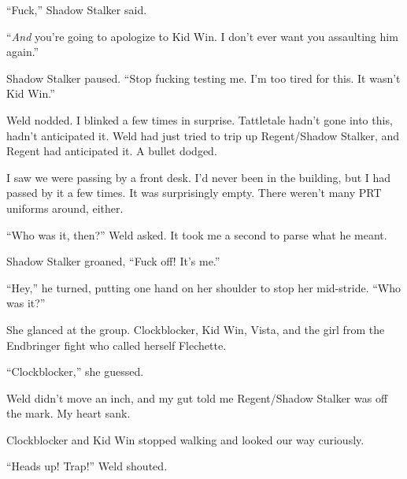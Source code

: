``Fuck,'' Shadow Stalker said.



``\emph{And} you're going to apologize to Kid Win.  I don't ever want you assaulting him again.''



Shadow Stalker paused.  ``Stop fucking testing me.  I'm too tired for this.  It wasn't Kid Win.''



Weld nodded.  I blinked a few times in surprise.  Tattletale hadn't gone into this, hadn't anticipated it. Weld had just tried to trip up Regent/Shadow Stalker, and Regent had anticipated it.  A bullet dodged.



I saw we were passing by a front desk.  I'd never been in the building, but I had passed by it a few times.  It was surprisingly empty.  There weren't many PRT uniforms around, either.



``Who was it, then?'' Weld asked.  It took me a second to parse what he meant.



Shadow Stalker groaned, ``Fuck off!  It's me.''



``Hey,'' he turned, putting one hand on her shoulder to stop her mid-stride.  ``Who was it?''



She glanced at the group.  Clockblocker, Kid Win, Vista, and the girl from the Endbringer fight who called herself Flechette.



``Clockblocker,'' she guessed.



Weld didn't move an inch, and my gut told me Regent/Shadow Stalker was off the mark.  My heart sank.



Clockblocker and Kid Win stopped walking and looked our way curiously.



``Heads up!  Trap!'' Weld shouted\emph{.}





